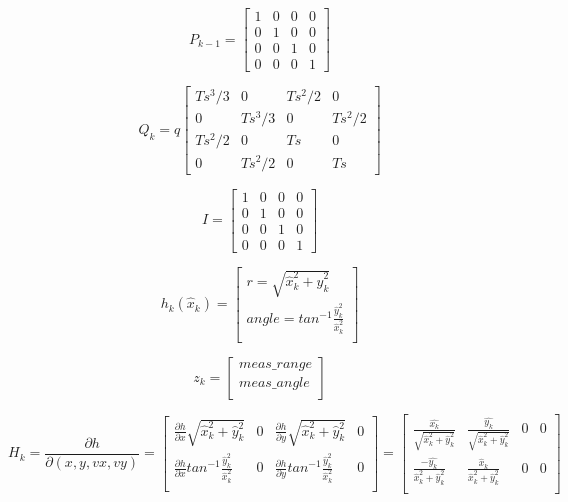 \documentclass[12pt]{article}
\begin{document}
\[
P_{k-1}=
  \begin{bmatrix}
1 & 0 & 0 & 0\\
0 & 1  & 0 & 0\\
0 & 0 & 1 &0\\
0 & 0 & 0 &1
  \end{bmatrix}
\]


\[
Q_{k} = q 		
  \begin{bmatrix}
Ts^{3}/3 & 0 & Ts^{2}/2 & 0\\
0 & Ts^{3}/3  & 0 & Ts^{2}/2\\
Ts^{2}/2 & 0 & Ts &0\\
0 & Ts^{2}/2 & 0 &Ts
  \end{bmatrix}
\]




\[
I =
  \begin{bmatrix}
1 & 0 & 0 & 0\\
0 & 1  & 0 & 0\\
0 & 0 & 1 &0\\
0 & 0 & 0 &1
  \end{bmatrix}
\]


\[
h_{k}(\hat{x}_{k})=
  \begin{bmatrix}
    r = \sqrt{  \hat{x}_k^{2} + \hat{y}_k^{2} } \\
    angle = tan^{-1} \frac{\hat{y}_k^{2}}{\hat{x}_k^{2}}\\

  \end{bmatrix}
\]

\[
z_{k}=
  \begin{bmatrix}
     meas\_range  \\
     meas\_angle\\

  \end{bmatrix}
\]


\[
H_{k} = \frac{\partial h}{\partial (x, y, vx, vy)} =
\begin{bmatrix}
\frac{\partial h}{\partial x} \sqrt{  \hat{x}_k^{2} + \hat{y}_k^{2}} & 0 & \frac{\partial h}{\partial y} \sqrt{  \hat{x}_k^{2} + \hat{y}_k^{2}} & 0\\
\frac{\partial h}{\partial x}tan^{-1} \frac{\hat{y}_k^{2}}{\hat{x}_k^{2}}  & 0 & \frac{\partial h}{\partial y}tan^{-1} \frac{\hat{y}_k^{2}}{\hat{x}_k^{2}} & 0\\

\end{bmatrix}
=
  \begin{bmatrix}
\frac{\hat{x_{k}}}{ \sqrt{\hat{x}_k^{2} + \hat{y}_k^{2}}} & \frac{\hat{y_{k}}}{ \sqrt{\hat{x}_k^{2} + \hat{y}_k^{2}}} & 0 & 0\\
\frac{-\hat{y_{k}}}{  \hat{x}_k^{2} + \hat{y}_k^{2}} & \frac{\hat{x}_k}{  \hat{x}_k^{2} + \hat{y}_k^{2}}  & 0 & 0\\

  \end{bmatrix}
\]
\end{document}
